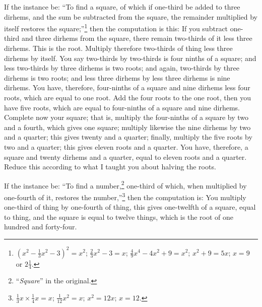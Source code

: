 If the instance be: ``To find a square, of which if one-third be added to three dirhems, and the sum be subtracted from the square, the remainder multiplied by itself restores the square;''\footnote{$(x^2 - \frac{1}{3}x^2 - 3)^2 = x^2$; $\frac{2}{3}x^2 - 3 = x$; $\frac{4}{9}x^4 - 4x^2 + 9 = x^2$; $x^2 + 9 = 5x$; $x = 9$ or $2\frac{1}{4}$.} then the computation is this: If you subtract one-third and three dirhems from the square, there remain two-thirds of it less three dirhems. This is the root. Multiply therefore two-thirds of thing less three dirhems by itself. You say two-thirds by two-thirds is four ninths of a square; and less two-thirds by three dirhems is two roots; and again, two-thirds by three dirhems is two roots; and less three dirhems by less three dirhems is nine dirhems. You have, therefore, four-ninths of a square and nine dirhems less four roots, which are equal to one root. Add the four roots to the one root, then you have five roots, which are equal to four-ninths of a square and nine dirhems. Complete now your square; that is, multiply the four-ninths of a square by two and a fourth, which gives one square; multiply likewise the nine dirhems by two and a quarter; this gives twenty and a quarter; finally, multiply the five roots by two and a quarter; this gives eleven roots and a quarter. You have, therefore, a square and twenty dirhems and a quarter, equal to eleven roots and a quarter. Reduce this according to what I taught you about halving the roots.

If the instance be: ``To find a number,\footnote{``\textit{Square}'' in the original.} one-third of which, when multiplied by one-fourth of it, restores the number,''\footnote{$\frac{1}{3}x \times \frac{1}{4}x = x$; $\frac{1}{12}x^2 = x$; $x^2 = 12x$; $x = 12$.} then the computation is: You multiply one-third of thing by one-fourth of thing, this gives one-twelfth of a square, equal to thing, and the square is equal to twelve things, which is the root of one hundred and forty-four.

